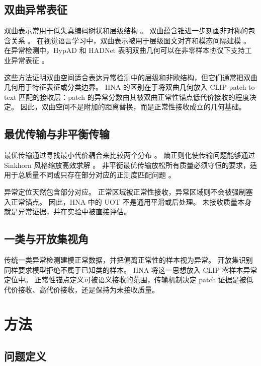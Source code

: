 \documentclass[10pt,fontset=none]{ctexart}
\newcommand{\method}{HNA}
\begin{document}
\subsection{双曲异常表征}

双曲表示常用于低失真编码树状和层级结构 \cite{nickel2017poincare,ganea2018hnn}。
双曲蕴含锥进一步刻画非对称的包含关系 \cite{ganea2018entailment}。
在视觉语言学习中，双曲表示被用于层级图文对齐和模态间隔建模 \cite{desai2023meru,ramasinghe2024modalitygap}。
在异常检测中，HypAD 和 HADNet 表明双曲几何可以在非零样本协议下支持工业异常表征 \cite{li2024hypad,hadnet2025}。

这些方法证明双曲空间适合表达异常检测中的层级和非欧结构，但它们通常把双曲几何用于特征表征或分类边界。
\method{} 的区别在于将双曲几何放入 CLIP patch-to-text 匹配的接收层：patch 的异常分数由其被双曲正常性锚点低代价接收的程度决定。
因此，双曲空间不是附加的距离替换，而是正常性接收成立的几何基础。

\subsection{最优传输与非平衡传输}

最优传输通过寻找最小代价耦合来比较两个分布 \cite{peyre2019ot}。
熵正则化使传输问题能够通过 Sinkhorn 风格缩放高效求解 \cite{cuturi2013sinkhorn}。
非平衡最优传输放松所有质量必须守恒的要求，适用于总质量不同或只存在部分对应的正测度匹配问题 \cite{chizat2018uot}。

异常定位天然包含部分对应。
正常区域被正常性接收，异常区域则不会被强制塞入正常锚点。
因此，\method{} 中的 UOT 不是通用平滑或后处理。
未接收质量本身就是异常证据，并在实验中被直接评估。

\subsection{一类与开放集视角}

传统一类异常检测建模正常数据，并把偏离正常性的样本视为异常。
开放集识别同样要求模型拒绝不属于已知类的样本。
\method{} 将这一思想放入 CLIP 零样本异常定位中。
正常性锚点定义可被语义接收的范围，传输机制决定 patch 证据是被低代价接收、高代价接收，还是保持为未接收质量。

\section{方法}

\subsection{问题定义}
\end{document}
